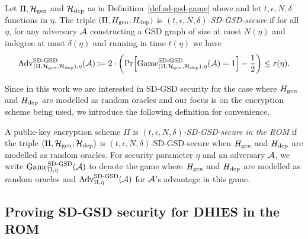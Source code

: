 \begin{definition}
	Let $\Pi, \mathcal{H}_\mathrm{gen}$ and $\mathcal{H}_\mathrm{dep}$ as in Definition~\ref{def:sd-gsd-game} above and let $t, \epsilon, N, \delta$ functions in $\eta$.
	The triple $(\Pi, H_\mathrm{gen}, H_\mathrm{dep})$ is \emph{$(t, \epsilon, N, \delta)$-SD-GSD-secure} if for all $\eta$, for any adversary $\mathcal{A}$ constructing a GSD graph of size at most $N(\eta)$ and indegree at most $\delta(\eta)$ and running in time $t(\eta)$ we have
	\begin{align*}
		\advantage{(\Pi, \fhgen, \fhdep)}{\eta}{SD\text{-}GSD}(\adv) \coloneqq 2 \cdot \left(\pr{\game{(\Pi, \fhgen, \fhdep)}{\eta}{SD\text{-}GSD}(\adv) = 1} - \frac{1}{2}\right) \le \epsilon(\eta).
	\end{align*}
\end{definition}

Since in this work we are interested in SD-GSD security for the case where $H_\mathrm{gen}$ and $H_\mathrm{dep}$ are modelled as random oracles and our focus is on the encryption scheme being used, we introduce the following definition for convenience.

\begin{definition}
	A public-key encryption scheme $\Pi$ is \emph{$(t, \epsilon, N, \delta)$-SD-GSD-secure in the ROM} if the triple $(\Pi, \mathcal{H}_\mathrm{gen}, \mathcal{H}_\mathrm{dep})$ is $(t, \epsilon, N, \delta)$-SD-GSD-secure when $H_\mathrm{gen}$ and $H_\mathrm{dep}$ are modelled as random oracles. For security parameter $\eta$ and an adversary $\mathcal{A}$, we write $\mathrm{Game}_{\Pi, \eta}^{\mathrm{SD\text{-}GSD}}(\mathcal{A})$ to denote the game where $H_\mathrm{gen}$ and $H_\mathrm{dep}$ are modelled as random oracles and $\mathrm{Adv}_{\Pi, \eta}^{\mathrm{SD\text{-}GSD}}(\mathcal{A})$ for $\mathcal{A}$'s advantage in this game.
\end{definition}

\subsection{Proving SD-GSD security for DHIES in the ROM}

